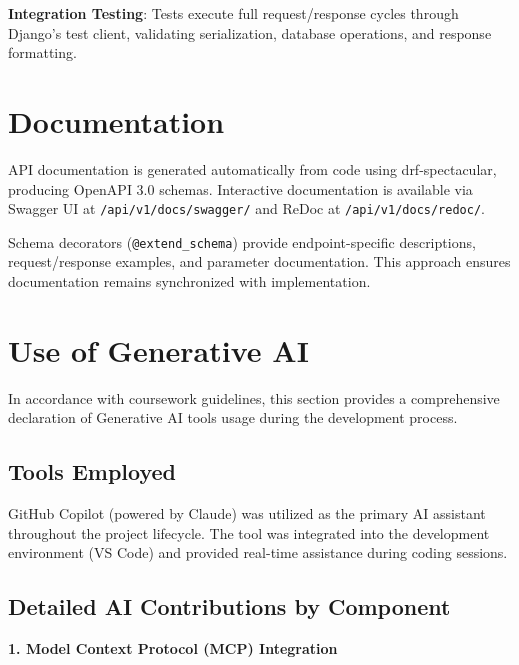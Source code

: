 \documentclass[11pt,a4paper]{article}
\begin{document}
\textbf{Integration Testing}: Tests execute full request/response cycles through Django's test client, validating serialization, database operations, and response formatting.

\section{Documentation}

API documentation is generated automatically from code using drf-spectacular, producing OpenAPI 3.0 schemas. Interactive documentation is available via Swagger UI at \texttt{/api/v1/docs/swagger/} and ReDoc at \texttt{/api/v1/docs/redoc/}.

Schema decorators (\texttt{@extend\_schema}) provide endpoint-specific descriptions, request/response examples, and parameter documentation. This approach ensures documentation remains synchronized with implementation.

\section{Use of Generative AI}

In accordance with coursework guidelines, this section provides a comprehensive declaration of Generative AI tools usage during the development process.

\subsection{Tools Employed}

GitHub Copilot (powered by Claude) was utilized as the primary AI assistant throughout the project lifecycle. The tool was integrated into the development environment (VS Code) and provided real-time assistance during coding sessions.

\subsection{Detailed AI Contributions by Component}

\textbf{1. Model Context Protocol (MCP) Integration}
\end{document}
